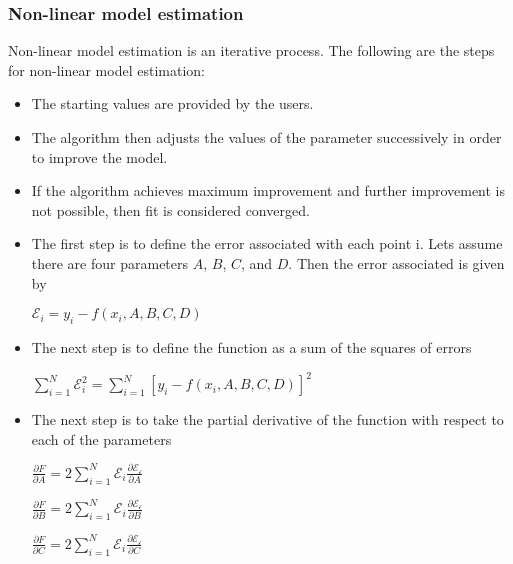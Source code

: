 \documentclass[a4paper]{aitthesis}
\begin{document}
\subsubsection{Non-linear model estimation}
Non-linear model estimation is an iterative process. The following are the steps for non-linear model estimation:
\begin{itemize}
\item The starting values are provided by the users.
\item The algorithm then adjusts the values of the parameter successively in order to improve the model.
\item If the algorithm achieves maximum improvement and further improvement is not possible, then fit is considered converged.
\item The first step is to define the error associated with each point i. Lets assume there are four parameters $A$, $B$, $C$, and $D$. Then the error associated is given by
\begin{center}
\large \textbf{$\mathscr{E}_i = y_i - f(x_i, A, B, C, D)$} 
\end{center}

\item The next step is to define the function as a sum of the squares of errors
\begin{center}
\large \textbf{$\sum_{i = 1}^{N}\mathscr{E}_i^2 = \sum_{i = 1}^{N}[y_i - f(x_i, A, B, C, D)]^2$} 
\end{center}

\item The next step is to take the partial derivative of the function with respect to each of the parameters
\begin{center}
\large \textbf{$\frac{\partial F}{\partial A}= 2 \sum_{i = 1}^{N}\mathscr{E}_i \frac{\partial \mathscr{E_i}}{\partial A}$}
\end{center}

\begin{center}
\large \textbf{$\frac{\partial F}{\partial B}= 2 \sum_{i = 1}^{N}\mathscr{E}_i \frac{\partial \mathscr{E_i}}{\partial B}$}
\end{center}

\begin{center}
\large \textbf{$\frac{\partial F}{\partial C}= 2 \sum_{i = 1}^{N}\mathscr{E}_i \frac{\partial \mathscr{E_i}}{\partial C}$}
\end{center}


\end{itemize}
\end{document}
